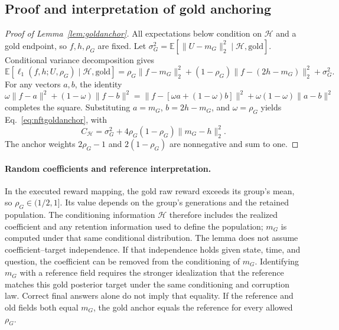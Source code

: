 \documentclass[11pt,letterpaper]{article}
\newcommand{\E}{\mathbb{E}}
\begin{document}
\subsection{Proof and interpretation of gold anchoring}
\label{app:nftgoldproof}

\begin{proof}[Proof of Lemma~\ref{lem:goldanchor}]
All expectations below condition on $\mathcal H$ and a gold endpoint, so $f,h,\rho_G$ are fixed. Let $\sigma_G^2=\E[\|U-m_G\|_2^2\mid\mathcal H,\mathrm{gold}]$. Conditional variance decomposition gives
\begin{equation}
 \E[\ell_1(f,h;U,\rho_G)\mid\mathcal H,\mathrm{gold}]
 =\rho_G\|f-m_G\|_2^2
 +(1-\rho_G)\|f-(2h-m_G)\|_2^2+\sigma_G^2.
\end{equation}
For any vectors $a,b$, the identity $\omega\|f-a\|^2+(1-\omega)\|f-b\|^2=\|f-[\omega a+(1-\omega)b]\|^2+\omega(1-\omega)\|a-b\|^2$ completes the square. Substituting $a=m_G$, $b=2h-m_G$, and $\omega=\rho_G$ yields Eq.~\eqref{eq:nftgoldanchor}, with
\begin{equation}
 C_{\mathcal H}=\sigma_G^2+4\rho_G(1-\rho_G)\|m_G-h\|_2^2.
\end{equation}
The anchor weights $2\rho_G-1$ and $2(1-\rho_G)$ are nonnegative and sum to one.
\end{proof}

\paragraph{Random coefficients and reference interpretation.}
In the executed reward mapping, the gold raw reward exceeds its group's mean, so $\rho_G\in(1/2,1]$. Its value depends on the group's generations and the retained population. The conditioning information $\mathcal H$ therefore includes the realized coefficient and any retention information used to define the population; $m_G$ is computed under that same conditional distribution. The lemma does not assume coefficient--target independence. If that independence holds given state, time, and question, the coefficient can be removed from the conditioning of $m_G$. Identifying $m_G$ with a reference field requires the stronger idealization that the reference matches this gold posterior target under the same conditioning and corruption law. Correct final answers alone do not imply that equality. If the reference and old fields both equal $m_G$, the gold anchor equals the reference for every allowed $\rho_G$.
\end{document}
